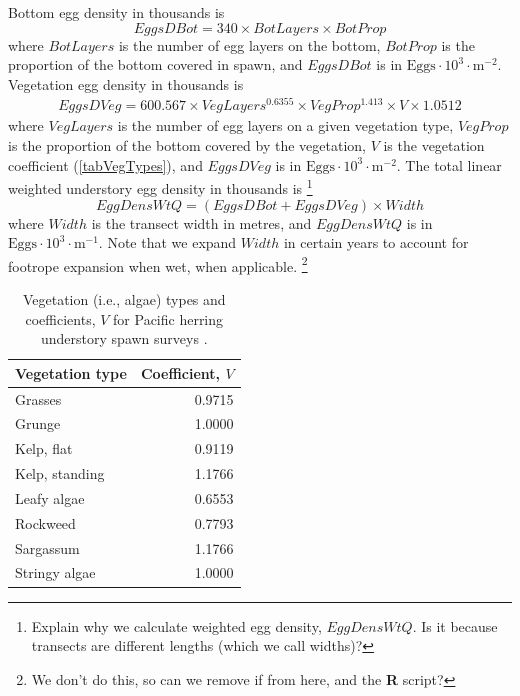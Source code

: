 \documentclass[12pt]{article}
\begin{document}
Bottom egg density in thousands is \citep{HaegeleEtal1979}
\begin{equation}
EggsDBot = 340 \times BotLayers \times BotProp
\label{eqEggDensUnderB}
\end{equation}
where $BotLayers$ is the number of egg layers on the bottom, $BotProp$ is the proportion of the bottom covered in spawn, and $EggsDBot$ is in $\text{Eggs} \cdot 10^{3} \cdot \text{m}^{-2}$.
Vegetation egg density in thousands is \citep{Schweigert2005}
\begin{multline}
EggsDVeg = 600.567 \times VegLayers^{0.6355} \times VegProp^{1.413} \times V \times 1.0512
\label{eqEggDensUnderV}
\end{multline}
where $VegLayers$ is the number of egg layers on a given vegetation type, $VegProp$ is the proportion of the bottom covered by the vegetation, $V$ is the vegetation coefficient (\autoref{tabVegTypes}), and $EggsDVeg$ is in $\text{Eggs} \cdot 10^{3} \cdot \text{m}^{-2}$.
The total linear weighted understory egg density in thousands is%
\footnote{Explain why we calculate weighted egg density, $EggDensWtQ$.
Is it because transects are different lengths (which we call widths)?}
\begin{equation}
EggDensWtQ = \left( EggsDBot + EggsDVeg \right) \times Width
\label{eqEggDensWtUnder}
\end{equation}
where $Width$ is the transect width in metres, and $EggDensWtQ$ is in $\text{Eggs} \cdot 10^{3} \cdot \text{m}^{-1}$.
Note that we expand $Width$ in certain years to account for footrope expansion when wet, when applicable.%
\footnote{We don't do this, so can we remove if from here, and the \textbf{R} script?}

\begin{table}
\centering
\caption[Vegetation (i.e., algae) types and coefficients for Pacific herring understory spawn surveys]
{Vegetation (i.e., algae) types and coefficients, $V$ for Pacific herring understory spawn surveys \citep{Schweigert2005}.}
\begin{tabular}{lr}
\toprule
Vegetation type & Coefficient, $V$\\
\midrule
Grasses & 0.9715 \\
Grunge & 1.0000 \\
Kelp, flat & 0.9119 \\
Kelp, standing & 1.1766 \\
Leafy algae & 0.6553 \\
Rockweed & 0.7793 \\
Sargassum & 1.1766 \\
Stringy algae & 1.0000 \\
\bottomrule
\end{tabular}
\label{tabVegTypes}
\end{table}
\end{document}
